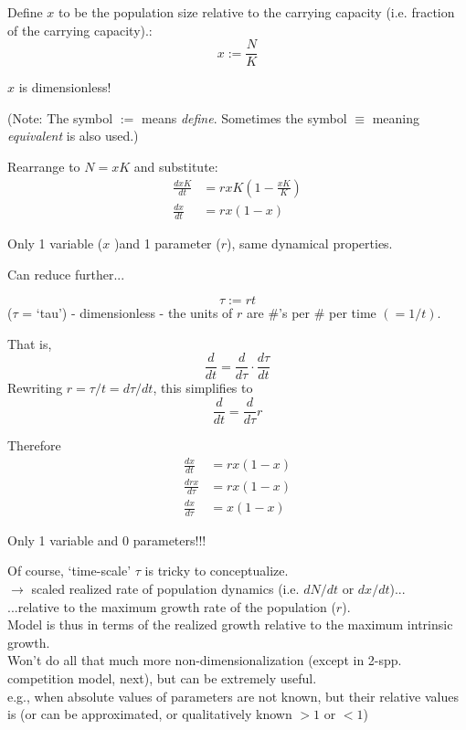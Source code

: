 \documentclass{article}
\newcommand{\ind}{\-\hspace{1cm}}
\begin{document}
\vspace{1cm}

Define $x$ to be the population size relative to the carrying capacity (i.e. fraction of the carrying capacity).:
\begin{equation*}
	x := \frac{N}{K}
\end{equation*}

$x$ is dimensionless!

\vspace{0.5cm}

(Note:  The symbol $:=$ means \emph{define}.  Sometimes the symbol $\equiv$ meaning \emph{equivalent} is also used.)

\vspace{0.5cm}

Rearrange to $N=xK$ and substitute:
\begin{align*}
      \frac{dxK}{dt}&=rxK \left( 1- \frac{xK}{K} \right)\\
       \frac{dx}{dt}&=rx \left( 1- x \right)
\end{align*}

Only 1 variable ($x$ )and 1 parameter ($r$), same dynamical properties.

Can reduce further...

\begin{equation*}
	\tau := r t
\end{equation*}
($\tau$ = `tau') - dimensionless - the units of $r$ are \#'s per \# per time $(=1/t)$. 

That is,
\begin{equation*} 
	\frac{d}{dt} = \frac{d}{d\tau} \cdot \frac{d\tau}{dt} 
\end{equation*}
Rewriting $r=\tau/t =d\tau/dt  $, this simplifies to
\begin{equation*}
	\frac{d}{dt} = \frac{d}{d\tau}r
\end{equation*}

\vspace{0.5cm}
Therefore
\begin{align*}
       \frac{dx}{dt}&=rx \left( 1- x \right)\\
       \frac{drx}{d\tau}&=rx \left( 1- x \right)\\
       \frac{dx}{d\tau}&=x \left( 1- x \right)
\end{align*}

Only 1 variable and 0 parameters!!!


Of course, `time-scale' $\tau$ is tricky to conceptualize.\\
\ind $\to$ scaled realized rate of population dynamics (i.e. $dN/dt$ or $dx/dt$)...\\
\ind \ind ...relative to the maximum growth rate of the population ($r$). \\

Model is thus in terms of the realized growth relative to the maximum intrinsic growth.\\

Won't do all that much more non-dimensionalization (except in 2-spp. competition model, next), but can be extremely useful.\\
e.g., when absolute values of parameters are not known, but their relative values is (or can be approximated, or qualitatively known  $>1$ or $< 1$)
\end{document}
